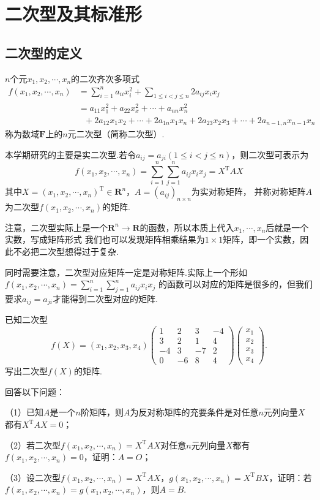 \section{二次型及其标准形}
\subsection{二次型的定义}
\begin{definition}
	$n$个元$x_1,x_2,\cdots,x_n$的二次齐次多项式
	\begin{align*}
		f(x_1,x_2,\cdots,x_n) &= \sum_{i=1}^{n}a_{ii}x_i^2+\sum\limits_{1\le i<j\le n}2a_{ij}x_ix_j \\
							  &= a_{11}x_1^2+a_{22}x_x^2+\cdots+a_{nn}x_n^2 \\
							  &\ \ \ +2a_{12}x_1x_2+\cdots+2a_{1n}x_1x_n+2a_{23}x_2x_3+\cdots+2a_{n-1,n}x_{n-1}x_n
	\end{align*}
	称为数域$\mathbf{F}$上的$n$元二次型（简称二次型）.
\end{definition}
本学期研究的主要是实二次型.若令$a_{ij}=a_{ji}(1\le i<j\le n)$，则二次型可表示为
$$f(x_1,x_2,\cdots,x_n)=\sum_{i=1}^{n}\sum_{j=1}^{n}a_{ij}x_ix_j=X^\mathrm{T}AX$$
其中$X=(x_1,x_2,\cdots,x_n)^\mathrm{T}\in\mathbf{R}^n$，$A=(a_{ij})_{n\times n}$为实对称矩阵，
并称对称矩阵$A$为二次型$f(x_1,x_2,\cdots,x_n)$的矩阵.

注意，二次型实际上是一个$\mathbf{R}^n\to\mathbf{R}$的函数，所以本质上代入$x_1,\cdots,x_n$后就是一个实数，写成矩阵形式
我们也可以发现矩阵相乘结果为$1\times 1$矩阵，即一个实数，因此不必把二次型想得过于复杂.

同时需要注意，二次型对应矩阵一定是对称矩阵.实际上一个形如$f(x_1,x_2,\cdots,x_n)=\sum\limits_{i=1}^{n}\sum\limits_{j=1}^{n}a_{ij}x_ix_j$
的函数可以对应的矩阵是很多的，但我们要求$a_{ij}=a_{ji}$才能得到二次型对应的矩阵.
\begin{example}
	已知二次型
	$$f(X)=(x_1,x_2,x_3,x_4)\begin{pmatrix}
		1 & 2 & 3 & -4 \\ 3 & 2 & 1 & 4 \\ -4 & 3 & -7 & 2 \\ 0 & -6 & 8 & 4
	\end{pmatrix}\begin{pmatrix}
		x_1 \\ x_2 \\ x_3 \\ x_4
	\end{pmatrix}.$$
	写出二次型$f(X)$的矩阵.
\end{example}
\begin{example}
	回答以下问题：

	\textup{（1）}已知$A$是一个$n$阶矩阵，则$A$为反对称矩阵的充要条件是对任意$n$元列向量$X$都有$X^\mathrm{T}AX=0$\textup{；}
	
	\textup{（2）}若二次型$f(x_1,x_2,\cdots,x_n)=X^\mathrm{T}AX$对任意$n$元列向量$X$都有$f(x_1,x_2,\cdots,x_n)=0$，证明：$A=O$\textup{；}
	
	\textup{（3）}设二次型$f(x_1,x_2,\cdots,x_n)=X^\mathrm{T}AX$，$g(x_1,x_2,\cdots,x_n)=X^\mathrm{T}BX$，证明：若$f(x_1,x_2,\cdots,x_n)=
	g(x_1,x_2,\cdots,x_n)$，则$A=B$.
\end{example}
